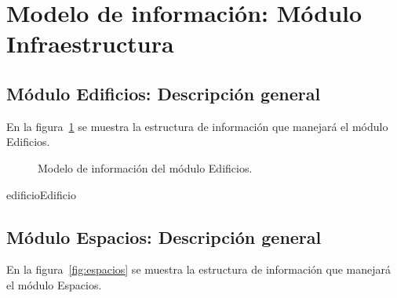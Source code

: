 
%

\newpage
\section{Modelo de información: Módulo Infraestructura}
\subsection{Módulo Edificios: Descripción general}
En la figura~\ref{fig:edificio} se muestra la estructura de información que manejará el módulo Edificios.

\begin{figure}[htbp!]
	\begin{center}
		\caption{Modelo de información del módulo Edificios.}
		\label{fig:edificio}
	\end{center}
\end{figure}

\begin{BusinessEntity}{edificio}{Edificio}
	
	
	
\end{BusinessEntity}

\subsection{Módulo Espacios: Descripción general}
En la figura~\ref{fig:espacios} se muestra la estructura de información que manejará el módulo Espacios.


